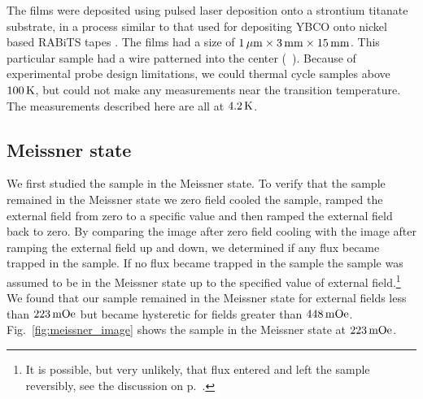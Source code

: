 The films were deposited using pulsed laser deposition onto a strontium 
titanate
substrate, in a process similar
to that used for depositing YBCO onto nickel based RABiTS tapes
\cite{feldman_apl_77_2000,feldman_2000,rabits_web}.
The films had a size of  $1\,\micron \times 3\,\mathrm{mm}
\times 15\,\mathrm{mm}$.
This particular sample had a wire patterned into the center
(\cf\ ).
Because of experimental probe design limitations, 
we could thermal cycle samples above $100\,\kelvin$, but could not 
make any measurements near the transition temperature.
The measurements described here are all at $4.2\,\kelvin$. 


\subsection{Meissner state}
\label{sec:ybco_meissner_state}

%
%
We first studied the sample in the Meissner state. To verify that the 
sample remained in the Meissner state we zero field cooled
the sample, ramped the external field from zero to a specific value
and then ramped the external field back to zero. By comparing the
image after zero field cooling with the image after ramping the
external field up and down, we determined if any flux became trapped
in the sample. If no flux became trapped in the sample
the sample was assumed to be in the Meissner state up to the specified value
of external field.\footnote{It is possible, but very unlikely, that flux
entered and left the sample reversibly, see the discussion on
p.~\pageref{sec:flux_motion_losses}. }
We found that our sample remained in the Meissner state for external 
fields less than $223\,\mOe$ but became hysteretic for fields greater than 
$448\,\mOe$. Fig.~\ref{fig:meissner_image}
shows  the sample in the 
Meissner state at $223\,\mOe$. 


